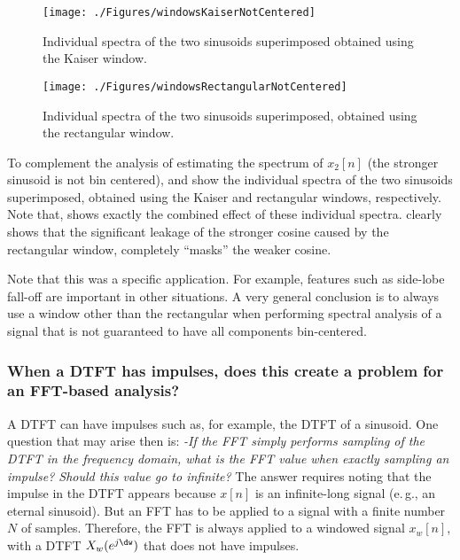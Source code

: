 \begin{figure}[htbp]
\centering
\texttt{[image: ./Figures/windowsKaiserNotCentered]}
\caption{Individual spectra of the two sinusoids superimposed obtained using the Kaiser window.\label{fig:windowsKaiserNotCentered}}
\end{figure}

\begin{figure}[htbp]
\centering
\texttt{[image: ./Figures/windowsRectangularNotCentered]}
\caption{Individual spectra of the two sinusoids superimposed, obtained using the rectangular window.\label{fig:windowsRectangularNotCentered}}
\end{figure}

To complement the analysis of estimating the spectrum of $x_2[n]$ (the stronger sinusoid is not bin centered),
 and  show the individual spectra of the two sinusoids superimposed, obtained using the Kaiser and rectangular windows, respectively. Note that,   shows exactly the combined effect of these individual spectra.  clearly shows that the significant leakage of the stronger cosine caused by the rectangular window, completely ``masks'' the weaker cosine. 

Note that this was a specific application. For example, features such as side-lobe fall-off are important in other situations. A very general conclusion is to always use a window other than the rectangular when performing spectral analysis of a signal that is not guaranteed to have all components bin-centered. 


\subsubsection{When a DTFT has impulses, does this create a problem for an FFT-based analysis?}
\label{sec:fft_of_impulses}
A DTFT can have impulses such as, for example, the DTFT of a sinusoid.
One question that may arise then is: \emph{-If the FFT simply performs sampling of the DTFT in the frequency domain, what is the FFT value when exactly sampling an impulse? Should this value go to infinite?}
The answer requires noting that the impulse in the DTFT appears because $x[n]$ is an infinite-long signal (e.\,g., an eternal sinusoid). But an FFT has to be applied to a signal with a finite number $N$ of samples. Therefore, the FFT is always applied to a windowed signal $x_w[n]$, with a DTFT $X_w(e^{j \dw})$ that does not have impulses.

